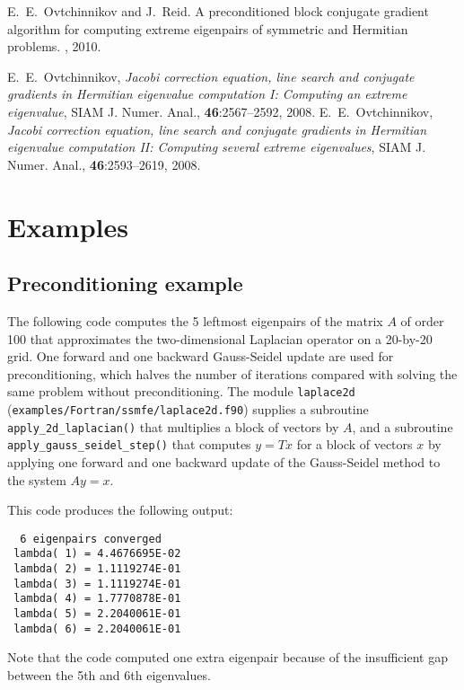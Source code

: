 
E.~E.~Ovtchinnikov and J.~Reid.
A preconditioned block conjugate gradient
algorithm for computing extreme eigenpairs
of symmetric and Hermitian problems.
\report, 2010.

E.~E.~Ovtchinnikov,
{\em Jacobi correction equation, line search and
conjugate gradients in Hermitian eigenvalue computation I:
Computing an extreme eigenvalue},
SIAM J. Numer. Anal., {\bf 46}:2567--2592, 2008.
E.~E.~Ovtchinnikov,
{\em Jacobi correction equation, line search and
conjugate gradients in Hermitian eigenvalue computation II:
Computing several extreme eigenvalues},
SIAM J. Numer. Anal., {\bf 46}:2593--2619, 2008.


\section{Examples}

\subsection{Preconditioning example}
\label{sec:ex.prec}

The following code 
computes the 5 leftmost eigenpairs of 
the matrix $A$ of order 100 that approximates 
the two-dimensional Laplacian operator
on a 20-by-20 grid.
One forward and one backward Gauss-Seidel update
are used for preconditioning,
which halves the number of iterations
compared with solving the same problem without preconditioning.
The module {\tt laplace2d} (\texttt{examples/Fortran/ssmfe/laplace2d.f90})
supplies a subroutine {\tt apply\_2d\_laplacian()}
that multiplies a block of vectors by $A$,
and a subroutine 
{\tt apply\_gauss\_seidel\_step()}
that computes $y = T x$ for a block of vectors $x$
by applying one forward and one backward update
of the Gauss-Seidel method to the system $A y = x$.

This code produces the following output:
\begin{verbatim}
  6 eigenpairs converged
 lambda( 1) = 4.4676695E-02
 lambda( 2) = 1.1119274E-01
 lambda( 3) = 1.1119274E-01
 lambda( 4) = 1.7770878E-01
 lambda( 5) = 2.2040061E-01
 lambda( 6) = 2.2040061E-01
\end{verbatim}

Note that the code computed one extra eigenpair
because of the insufficient gap between the 5th and 6th
eigenvalues.

